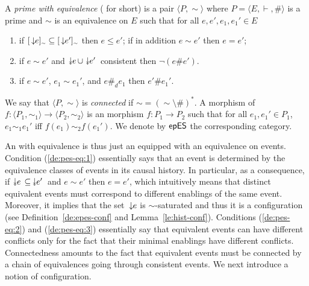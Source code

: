 \begin{definition}
  \label{de:pes-eq}
  A \emph{prime {\esabbr} with equivalence} ({\eseqabbr} for short) is
  a pair $\langle P, \sim \rangle$ where
  $P = \langle E, \vdash, \# \rangle$ is a prime {\esabbr} and $\sim$
  is an equivalence on $E$ such that for all $e, e', e_1, e_1' \in E$
  \begin{enumerate}
    
  \item
    \label{de:pes-eq:1}
    if
    $\eqclass[\sim]{\causes{e}} \subseteq \eqclass[\sim]{\causes{e'}}$
    then $e \leq e'$; if in addition $e \sim e'$ then $e=e'$;

  \item
    \label{de:pes-eq:2}
    if $e \sim e'$ and $\scauses{e} \cup \scauses{e'}$ consistent then
    $\neg (e \# e')$.
  
  \item
    \label{de:pes-eq:3}
    if $e \sim e'$, $e_1 \sim e_1'$, and $e \#_d e_1$ then $e' \# e_1'$.
  \end{enumerate}
  We say that $\langle P, \sim \rangle$ is {\emph{connected}}
  if ${\sim} = (\sim \setminus \#)^*$. A morphism of {\eseqabbr}
  $f : \langle P_1, \sim_1 \rangle \to \langle P_{{2}}, \sim_2 \rangle$ is
  an {\esabbr} morphism $f : P_1 \to P_2$ such that for all
  $e_1, e_1' \in P_1$, $e_1 \sim_1 e_1'$ iff
  $f(e_1) \sim_2 f(e_1')$. We denote by $\epes$ the corresponding
  category.
\end{definition}

An {\esabbr} with equivalence is thus just an {\esabbr} equipped with
an equivalence on events. Condition (\ref{de:pes-eq:1}) essentially
says that an event is determined by the equivalence classes of events
in its causal history. In particular, as a consequence, if
$\scauses{e} \subseteq\, \scauses{e'}$ and $e \sim e'$ then $e=e'$,
which intuitively means that distinct equivalent events must
correspond to different enablings of the same event. Moreover, it
implies that the set $\causes{e}$ is $\sim$-saturated and thus it is a
configuration (see Definition~\ref{de:epes-conf} and
Lemma~\ref{le:hist-conf}).
%
Conditions (\ref{de:pes-eq:2}) and (\ref{de:pes-eq:3}) essentially say that equivalent events can have different conflicts only for the fact that their minimal enablings have different conflicts.
%
Connectedness 
amounts to the fact that equivalent events must be connected by a 
chain of equivalences going through consistent events. 
%
We next introduce a notion of configuration.
 
